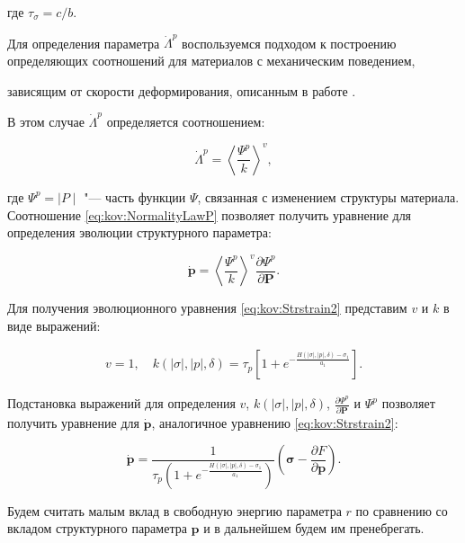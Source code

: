 где $\tau_{\sigma}=c/b$.



Для определения параметра $\dot{\Lambda}^{p}$ воспользуемся подходом к построению определяющих соотношений для материалов с механическим поведением,

зависящим от скорости деформирования, описанным в работе \cite{kostina:bib:MurakamiB}.

В этом случае $\dot{\Lambda}^{p}$ определяется соотношением:

$$

\dot{\Lambda}^{p}=\left<\frac{\Psi^p}{k} \right>^v,

$$

где  $\Psi^p=\mid P\mid$ "--- часть функции $\Psi$, связанная с изменением структуры материала. Соотношение  \eqref{eq:kov:NormalityLawP} позволяет получить уравнение для определения эволюции структурного параметра:

$$

\dot{\boldsymbol{p}}=\left<\frac{\Psi^p}{k} \right>^v \frac{\partial \Psi^{p}}{\partial{\boldsymbol{P}}}.

$$

Для получения эволюционного уравнения \eqref{eq:kov:Strstrain2} представим $v$ и $k$ в виде выражений:

\begin{gather*}

v=1,\quad

k(\mid\sigma\mid,\mid p\mid,\delta)=\tau_{p}\left[1+e^{-\frac{H(\mid\sigma\mid,\mid p\mid,\delta)-\sigma_{1}}{a_{1}}} \right].

\end{gather*}

Подстановка выражений для определения $v$, $k(\mid\sigma\mid,\mid p\mid,\delta)$, $\frac{\partial \Psi^{p}}{\partial{\boldsymbol{P}}}$  и $\Psi^{p}$ позволяет получить уравнение для $\dot{\boldsymbol{p}}$, аналогичное уравнению \eqref{eq:kov:Strstrain2}:

$$

\dot{\boldsymbol{p}}=\frac{1}{\tau_{p}\left(1+e^{-\frac{H(\mid\sigma\mid,\mid p \mid,\delta)-\sigma_{1}}{a_{1}}}\right)}\left(\boldsymbol{\sigma}-\frac{\partial F}{\partial{\boldsymbol{p}}}\right).

$$

Будем считать малым вклад в свободную энергию параметра $r$  по сравнению со вкладом структурного параметра $\boldsymbol{p}$ и в дальнейшем будем им пренебрегать.



